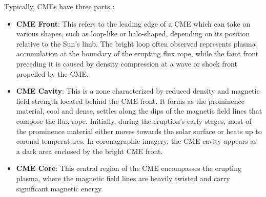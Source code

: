 Typically, CMEs have three parts \citep{vourlidas_2013}:
\begin{itemize}
	\item \textbf{CME Front}: This refers to the leading edge of a CME which can take on various shapes, such as loop-like or halo-shaped, depending on its position relative to the Sun's limb. The bright loop often observed represents plasma accumulation at the boundary of the erupting flux rope, while the faint front preceding it is caused by density compression at a wave or shock front propelled by the CME.
	
	\item \textbf{CME Cavity}: This is a zone characterized by reduced density and magnetic field strength located behind the CME front. It forms as the prominence material, cool and dense, settles along the dips of the magnetic field lines that compose the flux rope. Initially, during the eruption's early stages, most of the prominence material either moves towards the solar surface or heats up to coronal temperatures. In coronagraphic imagery, the CME cavity appears as a dark area enclosed by the bright CME front.
	
	\item \textbf{CME Core}: This central region of the CME encompasses the erupting plasma, where the magnetic field lines are heavily twisted and carry significant magnetic energy.
\end{itemize}
